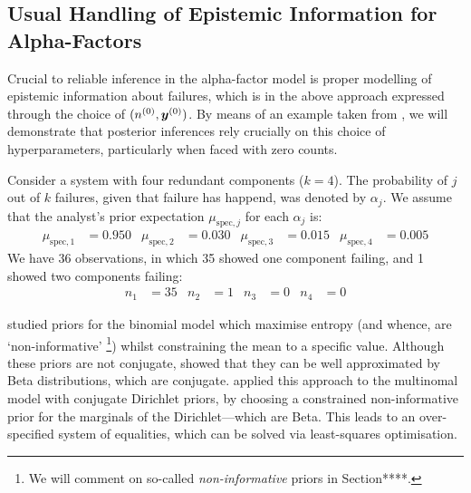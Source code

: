 \subsection{Usual Handling of Epistemic Information for Alpha-Factors}
\label{sec:epistemic-alpha}

Crucial to reliable inference in the alpha-factor model
is proper modelling of epistemic information about failures,
which is in the above approach expressed through the choice of $(n^{(0)},{\bm y}^{(0)})$.
By means of an example taken from \textcite{2011:kelly:atwood},
we will demonstrate that posterior inferences rely crucially on this choice of hyperparameters,
particularly when faced with zero counts.


Consider a system with four redundant components ($k=4$).
The probability of $j$ out of $k$ failures, given that failure has happend, was denoted by $\alpha_j$.
We assume that the analyst's prior expectation $\mu_{\text{spec},j}$ for each $\alpha_j$ is:
\begin{align}
  \label{eq:example:muspec}
  \mu_{\text{spec},1} &= 0.950
  &
  \mu_{\text{spec},2} &= 0.030
  &
  \mu_{\text{spec},3} &= 0.015
  &
  \mu_{\text{spec},4} &= 0.005
\end{align}
We have 36 observations, in which 35 showed one component failing,
and 1 showed two components failing:
\begin{align*}
  n_1 &= 35
  &
  n_2 &= 1
  &
  n_3 &= 0
  &
  n_4 &= 0
\end{align*}

\textcite{1996:atwood} studied priors for the binomial model
which maximise entropy (and whence, are `non-informative'%
\footnote{We will comment on so-called \emph{non-informative} priors in Section****.})
whilst constraining the mean to a specific value.
Although these priors are not conjugate,
\textcite{1996:atwood} showed that they can be well approximated by Beta distributions, which are conjugate.
%
\textcite{2011:kelly:atwood} applied this approach to the multinomal model with conjugate Dirichlet priors,
by choosing a constrained non-informative prior for the marginals of the Dirichlet---which are Beta.
This leads to an over-specified system of equalities, which can be solved via least-squares optimisation.

